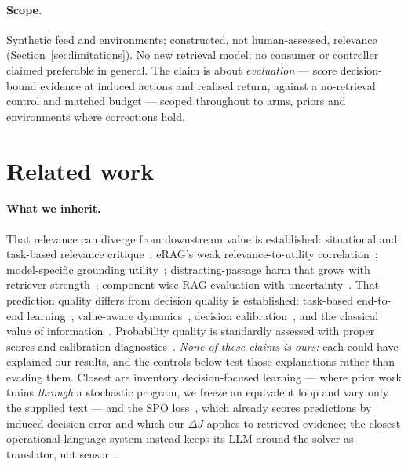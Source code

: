 \documentclass[runningheads]{llncs}
\begin{document}
\paragraph{Scope.} Synthetic feed and environments; constructed, not
human-assessed, relevance (Section~\ref{sec:limitations}). No new retrieval
model; no consumer or controller claimed preferable in general. The claim is
about \emph{evaluation} --- score decision-bound evidence at induced actions
and realised return, against a no-retrieval control and matched budget ---
scoped throughout to arms, priors and environments where corrections hold.

\section{Related work}
\label{sec:related}

\paragraph{What we inherit.}
That relevance can diverge from downstream value is established: situational
and task-based relevance critique~\cite{borlund2003concept}; eRAG's weak
relevance-to-utility correlation~\cite{salemi2024erag}; model-specific
grounding utility~\cite{grogu2026}; distracting-passage harm that grows with
retriever strength~\cite{cuconasu2024power,yoran2024making}; component-wise
RAG evaluation with uncertainty~\cite{saadfalcon2023ares,es2023ragas}. That
prediction quality differs from decision quality is established:
task-based end-to-end learning~\cite{donti2017task,elmachtoub2022smart,mandi2022rank}, value-aware dynamics~\cite{farahmand2017value,lambert2020objective}, decision calibration~\cite{zhao2021decision}, and the
classical value of information~\cite{howard1966information}. Probability
quality is standardly assessed with proper scores and calibration
diagnostics~\cite{guo2017calibration,degroot1983comparison,niculescu2005predicting}. \emph{None of these claims is ours:} each could have
explained our results, and the controls below test those explanations rather
than evading them. Closest are inventory decision-focused learning --- where
prior work trains \emph{through} a stochastic program, we freeze an
equivalent loop and vary only the supplied text --- and the SPO
loss~\cite{elmachtoub2022smart}, which already scores predictions by induced
decision error and which our $\Delta J$ applies to retrieved evidence; the
closest operational-language system instead keeps its LLM around the solver
as translator, not sensor~\cite{li2023optiguide}.
\end{document}
